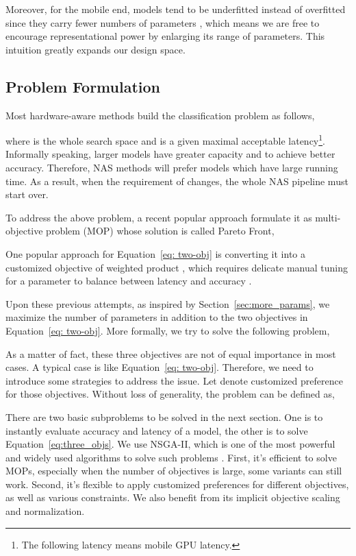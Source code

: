 \documentclass[letterpaper]{article} \usepackage{aaai20}  \usepackage{times}  \usepackage{helvet} \usepackage{courier}  \usepackage[hyphens]{url}  \usepackage{graphicx} \urlstyle{rm} \def\UrlFont{\rm}  \usepackage{graphicx}  \usepackage{amsmath}
\begin{document}
Moreover, for the mobile end, models tend to be underfitted instead of overfitted since they carry fewer numbers of parameters \cite{zhang2018shufflenet}, which means we are free to encourage representational power by enlarging its range of parameters. This intuition greatly expands our design space. 


\subsection{Problem Formulation}
\label{sec:prob}
Most hardware-aware methods build the classification problem as follows,

where  is the whole search space and  is a given maximal acceptable latency\footnote{The following latency means mobile GPU latency.}. Informally speaking, larger models have greater capacity and to achieve better accuracy. Therefore, NAS methods will prefer models which have large running time.  As a result, when the requirement of  changes, the whole NAS pipeline must start over.

To address the above problem, a recent popular approach formulate it as multi-objective problem (MOP) whose solution is called Pareto Front,



One popular approach for Equation~\ref{eq: two-obj} is converting it into a customized objective of weighted product  , which requires delicate manual tuning for a parameter  to balance between  latency and accuracy \cite{tan2018mnasnet}.

Upon these previous attempts, as inspired by Section~\ref{sec:more_params}, we maximize the number of parameters in addition to the two objectives in Equation~\ref{eq: two-obj}. More formally, we try to solve the following problem, 



As a matter of fact, these three objectives are not of equal importance in most cases. A typical case is like Equation~\ref{eq: two-obj}. Therefore, we need to introduce some strategies to address the issue. Let  denote customized preference for those objectives. Without loss of generality, the problem can be defined as,



There are two basic subproblems to be solved in the next section. One is to instantly evaluate accuracy and latency of a model, the other is  to solve Equation~\ref{eq:three_objs}. We use NSGA-II, which is one of the most powerful and widely used algorithms to solve such problems \cite{deb2002fast}. First, it's efficient to solve MOPs, especially when the number of objectives is large, some variants can still work. Second, it's flexible to apply customized preferences for different objectives, as well as various constraints. We also benefit from its implicit objective scaling and normalization.
\end{document}
